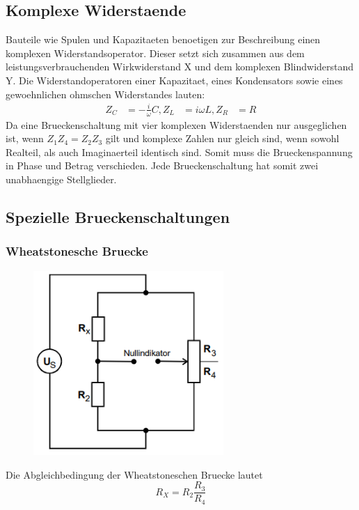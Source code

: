 \subsection{Komplexe Widerstaende}
Bauteile wie Spulen und Kapazitaeten benoetigen zur Beschreibung einen komplexen Widerstandsoperator. Dieser setzt sich zusammen aus dem leistungsverbrauchenden Wirkwiderstand X und dem komplexen Blindwiderstand Y.
Die Widerstandoperatoren einer Kapazitaet, eines Kondensators sowie eines gewoehnlichen ohmschen Widerstandes lauten:
\begin{align}
    Z_C&=-\frac{i}{\omega}C,
    Z_L&=i\omega L,
    Z_R&=R
\end{align}
Da eine Brueckenschaltung mit vier komplexen Widerstaenden nur ausgeglichen ist, wenn $Z_1Z_4=Z_2Z_3$ gilt und komplexe Zahlen nur gleich sind, wenn sowohl Realteil, als auch Imaginaerteil identisch sind. Somit muss die Brueckenspannung in Phase und Betrag verschieden. Jede Brueckenschaltung hat somit zwei unabhaengige Stellglieder.
\subsection{Spezielle Brueckenschaltungen}
\subsubsection{Wheatstonesche Bruecke}
\begin{figure}[H]
    \centering
    \captionsetup{justification=centering}
    \includegraphics[height=7cm]{"Wheatstone_Brueckenschaltung.png"}
    \label{Fig:Wheatstone}
\end{figure}
Die Abgleichbedingung der Wheatstoneschen Bruecke lautet 
\begin{equation}
    R_X=R_2\frac{R_3}{R_4}
\end{equation}
